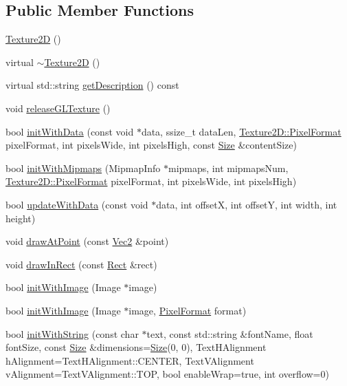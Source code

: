 \subsection*{Public Member Functions}
\begin{DoxyCompactItemize}
\item 
\hyperlink{classTexture2D_ab62c7c5172a4800b4629cd475147819d}{Texture2D} ()
\item 
virtual \hyperlink{classTexture2D_a84210f27b55799a096b8abc36380a077}{$\sim$\+Texture2D} ()
\item 
virtual std\+::string \hyperlink{classTexture2D_a3fd096dcfb192b188323c542edee64b5}{get\+Description} () const
\item 
void \hyperlink{classTexture2D_ae9edf32b4f3dc4841e09a2b1835fc08c}{release\+G\+L\+Texture} ()
\item 
bool \hyperlink{classTexture2D_a7e0c3fb5fc89625c4943dba0cba3b444}{init\+With\+Data} (const void $\ast$data, ssize\+\_\+t data\+Len, \hyperlink{classTexture2D_a45d9d8bb5a0669def36bbdfbfb91d220}{Texture2\+D\+::\+Pixel\+Format} pixel\+Format, int pixels\+Wide, int pixels\+High, const \hyperlink{classSize}{Size} \&content\+Size)
\item 
bool \hyperlink{classTexture2D_ae57b9e38403f115d0959308ec653a8b0}{init\+With\+Mipmaps} (Mipmap\+Info $\ast$mipmaps, int mipmaps\+Num, \hyperlink{classTexture2D_a45d9d8bb5a0669def36bbdfbfb91d220}{Texture2\+D\+::\+Pixel\+Format} pixel\+Format, int pixels\+Wide, int pixels\+High)
\item 
bool \hyperlink{classTexture2D_a06d6b7b456d0211776628f67e686f1bc}{update\+With\+Data} (const void $\ast$data, int offsetX, int offsetY, int width, int height)
\item 
void \hyperlink{classTexture2D_a58fcaf9540bdeac3b4858d0c3eaa5b97}{draw\+At\+Point} (const \hyperlink{classVec2}{Vec2} \&point)
\item 
void \hyperlink{classTexture2D_aaacff4a0ff5d60af71daa090f6e35654}{draw\+In\+Rect} (const \hyperlink{classRect}{Rect} \&rect)
\item 
bool \hyperlink{classTexture2D_a1ae4992389059e5f78785e28d28d53be}{init\+With\+Image} (Image $\ast$image)
\item 
bool \hyperlink{classTexture2D_a52292343ab1e6f4f3e20d35181d98b5f}{init\+With\+Image} (Image $\ast$image, \hyperlink{classTexture2D_a45d9d8bb5a0669def36bbdfbfb91d220}{Pixel\+Format} format)
\item 
bool \hyperlink{classTexture2D_af560d3c6590d2c656ae5b0d16c0a94d9}{init\+With\+String} (const char $\ast$text, const std\+::string \&font\+Name, float font\+Size, const \hyperlink{classSize}{Size} \&dimensions=\hyperlink{classSize}{Size}(0, 0), Text\+H\+Alignment h\+Alignment=Text\+H\+Alignment\+::\+C\+E\+N\+T\+ER, Text\+V\+Alignment v\+Alignment=Text\+V\+Alignment\+::\+T\+OP, bool enable\+Wrap=true, int overflow=0)

\end{DoxyCompactItemize}

